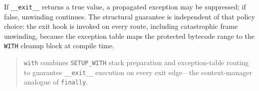 If \texttt{\_\_exit\_\_} returns a true value, a propagated exception may be suppressed; if false, unwinding continues. The structural guarantee is independent of that policy choice: the exit hook is invoked on every route, including catastrophic frame unwinding, because the exception table maps the protected bytecode range to the \texttt{WITH} cleanup block at compile time.

\begin{quote}
\texttt{with} combines \texttt{SETUP\_WITH} stack preparation and exception-table routing to guarantee \texttt{\_\_exit\_\_} execution on every exit edge---the context-manager analogue of \texttt{finally}.
\end{quote}
